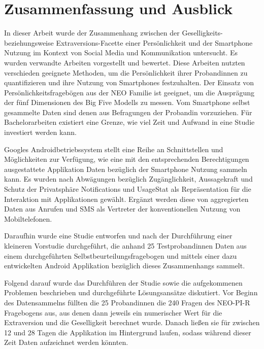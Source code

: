 
\chapter{Zusammenfassung und Ausblick}
\label{ch:Zusammenfassung}


In dieser Arbeit wurde der Zusammenhang zwischen der Geselligkeits- beziehungsweise Extraversions-Facette
einer Persönlichkeit und der Smartphone Nutzung im Kontext von Social Media und Kommunikation untersucht.
Es wurden verwandte Arbeiten vorgestellt und bewertet. 
Diese Arbeiten nutzten verschieden geeignete Methoden, um die Persönlichkeit ihrer Probandinnen zu quantifizieren und ihre Nutzung von Smartphones festzuhalten.
Der Einsatz von Persönlichkeitsfragebögen aus der NEO Familie ist geeignet, um die Ausprägung der fünf Dimensionen des Big Five Modells zu messen.
Vom Smartphone selbst gesammelte Daten sind denen aus Befragungen der Probandin vorzuziehen.
Für Bachelorarbeiten existiert eine Grenze, wie viel Zeit und Aufwand in eine Studie investiert werden kann. 
\par
Googles Androidbetriebssystem stellt eine Reihe an Schnittstellen und Möglichkeiten zur Verfügung, wie eine mit den entsprechenden Berechtigungen ausgestattete Applikation
Daten bezüglich der Smartphone Nutzung sammeln kann.
Es wurden nach Abwägungen bezüglich Zugänglichkeit, Aussagekraft und Schutz der Privatsphäre Notifications und UsageStat als Repräsentation für die Interaktion mit Applikationen gewählt.
Ergänzt werden diese von aggregierten Daten aus Anrufen und SMS als Vertreter der konventionellen Nutzung von Mobiltelefonen.
\par
Daraufhin wurde eine Studie entworfen und nach der Durchführung einer kleineren Vorstudie durchgeführt, die anhand 25 Testprobandinnen Daten aus einem durchgeführten Selbstbeurteilungsfragebogen und
 mittels einer dazu entwickelten Android Applikation bezüglich dieses Zusammenhangs sammelt.

Folgend darauf wurde das Durchführen der Studie sowie die aufgekommenen Problemen beschrieben und durchgeführte Lösungsansätze diskutiert.
Vor Beginn des Datensammelns füllten die 25 Probandinnen die 240 Fragen des NEO-PI-R Fragebogens aus, aus denen dann jeweils ein numerischer Wert für die Extraversion und die Geselligkeit berechnet wurde.
Danach ließen sie für zwischen 12 und 28 Tagen die Applikation im Hintergrund laufen, sodass während dieser Zeit Daten aufzeichnet werden könnten.

